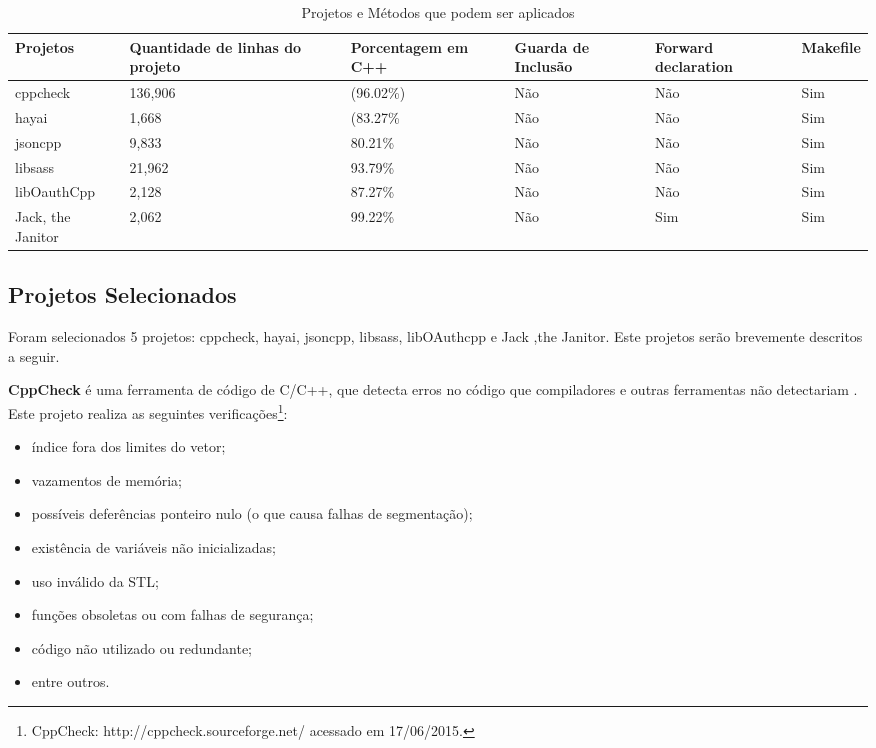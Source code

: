 \begin{table}[h]
\centering
\begin{tabular}{|l|p{2cm}|p{2cm}|p{2cm}|p{2cm}|p{2cm}|}
	\hline
	Projetos & Quantidade de linhas do projeto & Porcentagem em C++ &
	Guarda de Inclusão & Forward declaration & Makefile \\
	\hline
	cppcheck & 136,906 & (96.02\%) & Não & Não & Sim \\
	\hline
	hayai & 1,668 & (83.27\% & Não & Não & Sim \\
	\hline
	jsoncpp & 9,833 & 80.21\% & Não & Não & Sim \\
	\hline
	libsass & 21,962 & 93.79\% & Não & Não & Sim \\
	\hline
	libOauthCpp & 2,128 & 87.27\% & Não & Não & Sim \\
	\hline
	Jack, the Janitor & 2,062 & 99.22\% & Não & Sim & Sim \\
	\hline
\end{tabular}
\caption{Projetos e Métodos que podem ser aplicados}
\label{tab:projects}
\end{table}

\subsection{Projetos Selecionados}

Foram selecionados 5 projetos: cppcheck, hayai, jsoncpp, libsass,
 libOAuthcpp e Jack ,the Janitor. Este projetos serão brevemente 
descritos a seguir.

\textbf{CppCheck} é uma ferramenta de código de C/C++, que detecta erros no código
 que compiladores e outras ferramentas não detectariam . Este projeto realiza
 as seguintes verificações\footnote{CppCheck: http://cppcheck.sourceforge.net/
  acessado em 17/06/2015.}:

\begin{itemize}
	\item índice fora dos limites do vetor;    
    \item vazamentos de memória;
    \item possíveis deferências ponteiro nulo (o que causa falhas de segmentação);
	\item existência de variáveis não inicializadas;
	\item uso inválido da STL;
	\item funções obsoletas ou com falhas de segurança; 
	\item código não utilizado ou redundante;
	\item entre outros.
\end{itemize}


